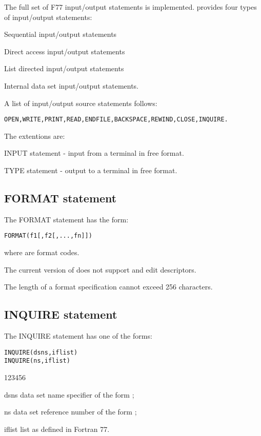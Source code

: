 The full set of F77 input/output statements is implemented.
\COMIS{} provides four types of input/output statements:
\begin{UL}
  \item Sequential input/output statements
  \item Direct access input/output statements
  \item List directed input/output statements
  \item Internal data set input/output statements.
\end{UL}
 
A list of \COMIS{} input/output source statements follows:
\begin{alltt}
 OPEN, WRITE, PRINT, READ, ENDFILE, BACKSPACE, REWIND, CLOSE, INQUIRE.
\end{alltt}
 
The \COMIS{} extentions are:
\begin{UL}
\item INPUT statement  - input from a terminal in free format.
\item TYPE  statement  - output to a terminal in free format.
\end{UL}
 
\subsection*{FORMAT statement}
 
The FORMAT statement has the form:
\begin{alltt}
 FORMAT( f1 [,f2 [,...,fn]])
\end{alltt}
where  are format codes.
 
The current version of \COMIS{} does not support
 and  edit descriptors.

The length of a format specification cannot exceed 256 characters.
 
\subsection*{INQUIRE statement}
 
The INQUIRE statement has one of the forms:
\begin{alltt}
       INQUIRE(dsns,iflist)
       INQUIRE(  ns,iflist)
\end{alltt}

\begin{DLtt}{123456}
\item[dsns]    data set name specifier of the form ;
\item[ns]      data set reference number of the form ;
\item[iflist]  list as defined in Fortran 77.
\end{DLtt}
 
